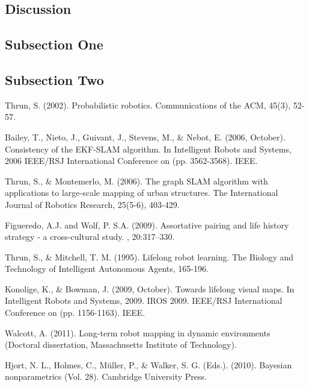 \documentclass[twoside]{article}
\begin{document}
\begin{multicols}{2}
\section{Discussion}

\subsection{Subsection One}

\lipsum[7] %

\subsection{Subsection Two}

\lipsum[8] %


\begin{thebibliography}{9} %

\newblock Thrun, S. (2002). Probabilistic robotics. Communications of the ACM, 45(3), 52-57.


\newblock Bailey, T., Nieto, J., Guivant, J., Stevens, M., \& Nebot, E. (2006, October). Consistency of the EKF-SLAM algorithm. In Intelligent Robots and Systems, 2006 IEEE/RSJ International Conference on (pp. 3562-3568). IEEE.

\newblock Thrun, S., \& Montemerlo, M. (2006). The graph SLAM algorithm with applications to large-scale mapping of urban structures. The International Journal of Robotics Research, 25(5-6), 403-429.

Figueredo, A.J. and Wolf, P. S.A. (2009).
\newblock Assortative pairing and life history strategy - a cross-cultural
  study.
, 20:317--330.

\newblock Thrun, S., \& Mitchell, T. M. (1995). Lifelong robot learning. The Biology and Technology of Intelligent Autonomous Agents, 165-196.

\newblock Konolige, K., \& Bowman, J. (2009, October). Towards lifelong visual maps. In Intelligent Robots and Systems, 2009. IROS 2009. IEEE/RSJ International Conference on (pp. 1156-1163). IEEE.

\newblock Walcott, A. (2011). Long-term robot mapping in dynamic environments (Doctoral dissertation, Massachusetts Institute of Technology).

\newblock Hjort, N. L., Holmes, C., Müller, P., \& Walker, S. G. (Eds.). (2010). Bayesian nonparametrics (Vol. 28). Cambridge University Press.


\end{thebibliography}
\end{multicols}
\end{document}
